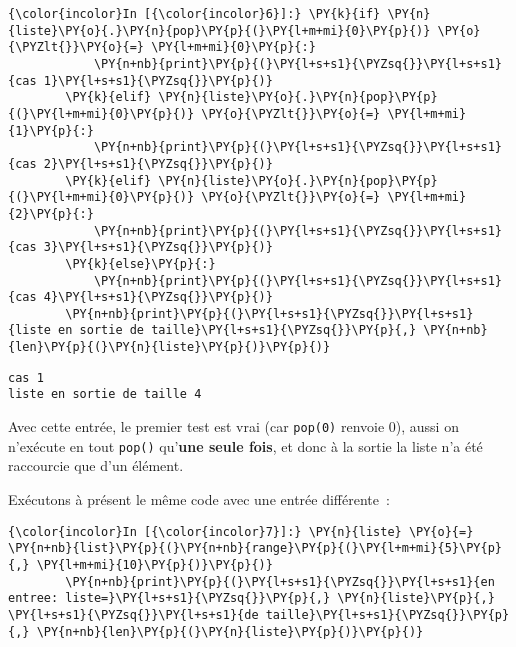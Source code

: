     \begin{Verbatim}[commandchars=\\\{\}]
{\color{incolor}In [{\color{incolor}6}]:} \PY{k}{if} \PY{n}{liste}\PY{o}{.}\PY{n}{pop}\PY{p}{(}\PY{l+m+mi}{0}\PY{p}{)} \PY{o}{\PYZlt{}}\PY{o}{=} \PY{l+m+mi}{0}\PY{p}{:}
            \PY{n+nb}{print}\PY{p}{(}\PY{l+s+s1}{\PYZsq{}}\PY{l+s+s1}{cas 1}\PY{l+s+s1}{\PYZsq{}}\PY{p}{)}
        \PY{k}{elif} \PY{n}{liste}\PY{o}{.}\PY{n}{pop}\PY{p}{(}\PY{l+m+mi}{0}\PY{p}{)} \PY{o}{\PYZlt{}}\PY{o}{=} \PY{l+m+mi}{1}\PY{p}{:}
            \PY{n+nb}{print}\PY{p}{(}\PY{l+s+s1}{\PYZsq{}}\PY{l+s+s1}{cas 2}\PY{l+s+s1}{\PYZsq{}}\PY{p}{)}
        \PY{k}{elif} \PY{n}{liste}\PY{o}{.}\PY{n}{pop}\PY{p}{(}\PY{l+m+mi}{0}\PY{p}{)} \PY{o}{\PYZlt{}}\PY{o}{=} \PY{l+m+mi}{2}\PY{p}{:}
            \PY{n+nb}{print}\PY{p}{(}\PY{l+s+s1}{\PYZsq{}}\PY{l+s+s1}{cas 3}\PY{l+s+s1}{\PYZsq{}}\PY{p}{)}
        \PY{k}{else}\PY{p}{:}
            \PY{n+nb}{print}\PY{p}{(}\PY{l+s+s1}{\PYZsq{}}\PY{l+s+s1}{cas 4}\PY{l+s+s1}{\PYZsq{}}\PY{p}{)}
        \PY{n+nb}{print}\PY{p}{(}\PY{l+s+s1}{\PYZsq{}}\PY{l+s+s1}{liste en sortie de taille}\PY{l+s+s1}{\PYZsq{}}\PY{p}{,} \PY{n+nb}{len}\PY{p}{(}\PY{n}{liste}\PY{p}{)}\PY{p}{)}
\end{Verbatim}


    \begin{Verbatim}[commandchars=\\\{\}]
cas 1
liste en sortie de taille 4

    \end{Verbatim}

    Avec cette entrée, le premier test est vrai (car \texttt{pop(0)} renvoie
0), aussi on n'exécute en tout \texttt{pop()} qu'\textbf{une seule
fois}, et donc à la sortie la liste n'a été raccourcie que d'un élément.

    Exécutons à présent le même code avec une entrée différente~:

    \begin{Verbatim}[commandchars=\\\{\}]
{\color{incolor}In [{\color{incolor}7}]:} \PY{n}{liste} \PY{o}{=} \PY{n+nb}{list}\PY{p}{(}\PY{n+nb}{range}\PY{p}{(}\PY{l+m+mi}{5}\PY{p}{,} \PY{l+m+mi}{10}\PY{p}{)}\PY{p}{)}
        \PY{n+nb}{print}\PY{p}{(}\PY{l+s+s1}{\PYZsq{}}\PY{l+s+s1}{en entree: liste=}\PY{l+s+s1}{\PYZsq{}}\PY{p}{,} \PY{n}{liste}\PY{p}{,} \PY{l+s+s1}{\PYZsq{}}\PY{l+s+s1}{de taille}\PY{l+s+s1}{\PYZsq{}}\PY{p}{,} \PY{n+nb}{len}\PY{p}{(}\PY{n}{liste}\PY{p}{)}\PY{p}{)}
\end{Verbatim}


